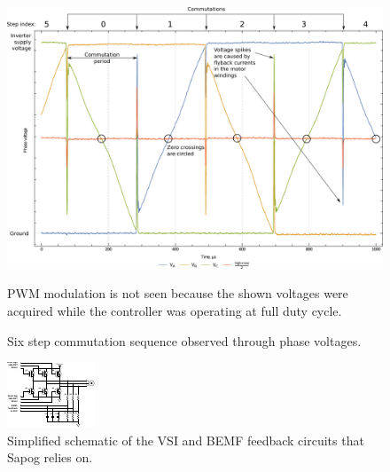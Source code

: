 \documentclass{zubaxdoc}
\begin{document}
\begin{figure}[hbt]
    \centering
	\includegraphics[width=\textwidth]{commutation_basics}
	\caption{Six step commutation sequence observed through phase voltages.
	\label{commutation_basics}}
	PWM modulation is not seen because the shown voltages were acquired while the controller
	was operating at full duty cycle.
\end{figure}

\begin{figure}[hbt]
    \centering
	\includegraphics[width=\textwidth]{power_stage_schematic}
	\caption{Simplified schematic of the VSI and BEMF feedback circuits that Sapog relies on.
	\label{power_stage_schematic}}
\end{figure}
\end{document}
